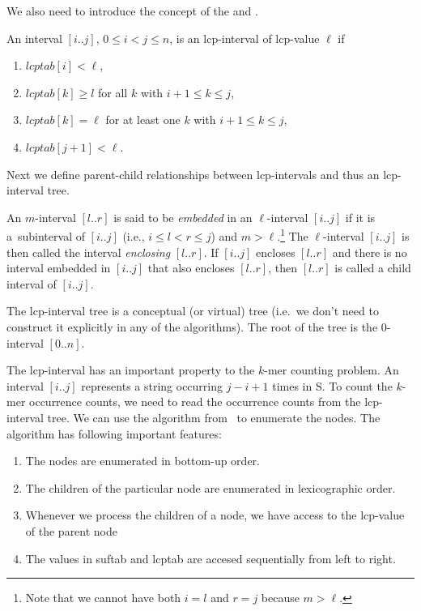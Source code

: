 We also need to introduce the concept of the  and .
\begin{definition}
An interval $[i..j]$, $0 \leq i < j \leq n$, is an lcp-interval of lcp-value $\ell$ if

\begin{enumerate}
\item $lcptab[i] < \ell$,
\item $lcptab[k] \geq l$ for all $k$ with $i + 1 \leq k \leq j$,
\item $lcptab[k] = \ell$ for at least one $k$ with $i + 1 \leq k \leq j$,
\item $lcptab[j + 1] < \ell$.
\end{enumerate}
\cite{enhancedsuffixarrays}
\end{definition}

Next we define parent-child relationships between lcp-intervals and thus an lcp-interval tree.

\begin{definition}
  An $m$-interval $[l..r]$ is said to be \emph{embedded} in an $\ell$-interval $[i..j]$ if it is a~subinterval of $[i..j]$ (i.e., $i \leq l < r \leq j $) and $m > \ell$.\footnote{Note that we cannot have both $i = l$ and $r = j$ because $m > \ell$.}
  The $\ell$-interval $[i..j ]$ is then called the interval \emph{enclosing} $[l..r]$. If $[i..j]$ encloses $[l..r]$ and there is no interval embedded in $[i..j]$ that also encloses $[l..r]$, then $[l..r]$ is called a child interval of $[i..j]$.\cite{enhancedsuffixarrays}
\end{definition}

The lcp-interval tree is a conceptual (or virtual) tree (i.e.\ we don't need to construct it explicitly in any of the algorithms). The root of the tree is the $0$-interval $[0..n]$.

The lcp-interval has an important property to the $k$-mer counting problem. An interval $[i..j]$ represents a string occurring $j - i + 1$ times in S\cite{tallymer}. To count the $k$-mer occurrence counts, we need to read the occurrence counts from the lcp-interval tree. We can use the algorithm from~\cite{enhancedsuffixarrays} to enumerate the nodes. The algorithm has following important features:

\begin{enumerate}
  \item The nodes are enumerated in bottom-up order.
  \item The children of the particular node are enumerated in lexicographic order.
  \item Whenever we process the children of a node, we have access to the lcp-value of the parent node %
  \item The values in suftab and lcptab are accesed sequentially from left to right.
\end{enumerate}

